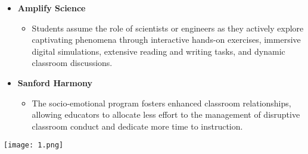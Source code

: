 \documentclass[11pt]{article}
\begin{document}
\begin{itemize}
\item \textbf{Amplify Science}
\begin{itemize}
\item Students assume the role of scientists or engineers as they actively explore captivating phenomena through interactive hands-on exercises, immersive digital simulations, extensive reading and writing tasks, and dynamic classroom discussions.
\end{itemize}

\item \textbf{Sanford Harmony}
\begin{itemize}
\item The socio-emotional program fosters enhanced classroom relationships, allowing educators to allocate less effort to the management of disruptive classroom conduct and dedicate more time to instruction.
\end{itemize}
\end{itemize}

\begin{center}
\texttt{[image: 1.png]}
\end{center}
\end{document}
